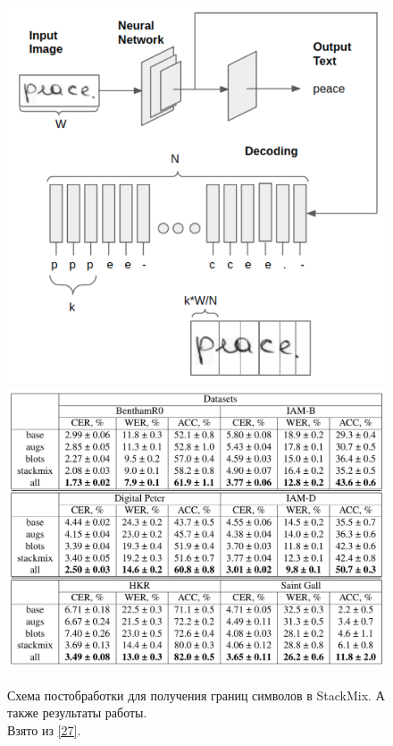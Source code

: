 \begin{figure}
    \centering
    \includegraphics[scale=0.25]{./images/stackmix_algo.png}
    \includegraphics[scale=0.2]{./images/stackmix_results.png}
    \caption{\protect\hypertarget{image9}{Схема постобработки для получения границ символов в StackMix. А также результаты работы. \\ Взято из \protect\hyperlink{cite.Sho21}{[27]}.}}
\end{figure}

